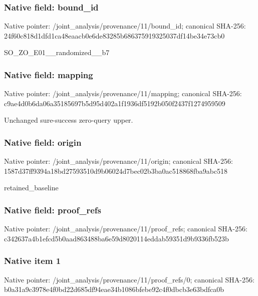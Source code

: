 \documentclass[10pt,a4paper]{article}
\begin{document}
\subsubsection{Native field: bound\_\allowbreak{}id}
Native pointer: /joint\_\allowbreak{}analysis/provenance/11/bound\_\allowbreak{}id; canonical SHA-256: 24f60c818d1dfd1ca48eaacb0e6de83285b686375919325037df14be34e73cb0

\begingroup\raggedright\sloppy SO\_\allowbreak{}ZO\_\allowbreak{}E01\_\allowbreak{}\_\allowbreak{}randomized\_\allowbreak{}\_\allowbreak{}b7\par\endgroup

\subsubsection{Native field: mapping}
Native pointer: /joint\_\allowbreak{}analysis/provenance/11/mapping; canonical SHA-256: c9ae4d0b6da06a35185697b5d95d402a1f1936df5192b050f2437f1274959509

\begingroup\raggedright\sloppy Unchanged sure-success zero-query upper.\par\endgroup

\subsubsection{Native field: origin}
Native pointer: /joint\_\allowbreak{}analysis/provenance/11/origin; canonical SHA-256: 1587d37ff9394a18bd27593510d9b06024d7bec02b3ba0ac518868fba9abc518

\begingroup\raggedright\sloppy retained\_\allowbreak{}baseline\par\endgroup

\subsubsection{Native field: proof\_\allowbreak{}refs}
Native pointer: /joint\_\allowbreak{}analysis/provenance/11/proof\_\allowbreak{}refs; canonical SHA-256: c342637a4b1efcd5b0aad863488ba6e59d8020114eddab59351d9b9336fb523b

\subsubsection{Native item 1}
Native pointer: /joint\_\allowbreak{}analysis/provenance/11/proof\_\allowbreak{}refs/0; canonical SHA-256: b0a31a9c3978e4f0bd22d685df94eae34b1086bfebe92c4f0dbcb3e63bdfca0b
\end{document}
